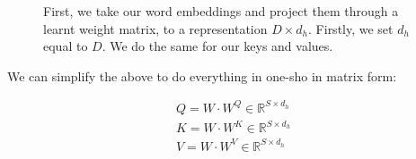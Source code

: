 \documentclass[11pt]{article}
\begin{document}
\begin{figure}[H]
    \centering
    \caption*{First, we take our word embeddings and project them through a learnt weight matrix, to a representation $D\times d_h$. Firstly, we set $d_h$ equal to $D$. We do the same for our keys and values.}
\end{figure}

We can simplify the above to do everything in one-sho in matrix form:

\begin{gather}
    Q = W \cdot W^Q \in \mathbb R^{S \times d_h} \\
    K = W \cdot W^K \in \mathbb R^{S \times d_h} \\
    V = W \cdot W^V \in \mathbb R^{S \times d_h}
\end{gather}
\end{document}
